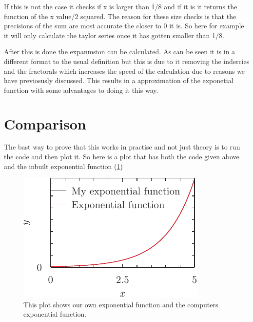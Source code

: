 \documentclass{article}
\begin{document}
If this is not the case it checks if x is larger than 1/8 and if it is it returns the function of the x value/2 squared. The reason for these size checks is that the precisions of the sum are most accurate the closer to 0 it is. So here for example it will only calculate the taylor series once it has gotten smaller than 1/8. 

After this is done the expanmsion can be calculated. As can be seen it is in a different format to the usual definition but this is due to it removing the indercies and the fractorals which increases the speed of the calculation due to reasons we have previosusly discussed. This results in a approximation of the exponetial function with some advantages to doing it this way.

\section{Comparison}
The bast way to prove that this works in practise and not just theory is to run the code and then plot it. So here is a plot that has both the code given above and the inbuilt exponential function (\ref{fig:plot})
	
\begin{figure}\label{fig:plot}
\includegraphics{fig-pyxplot.pdf}
\caption{This plot shows our own exponential function and the computers exponential function.}
\end{figure}



\begin{thebibliography}{9}

\end{thebibliography}
\end{document}
